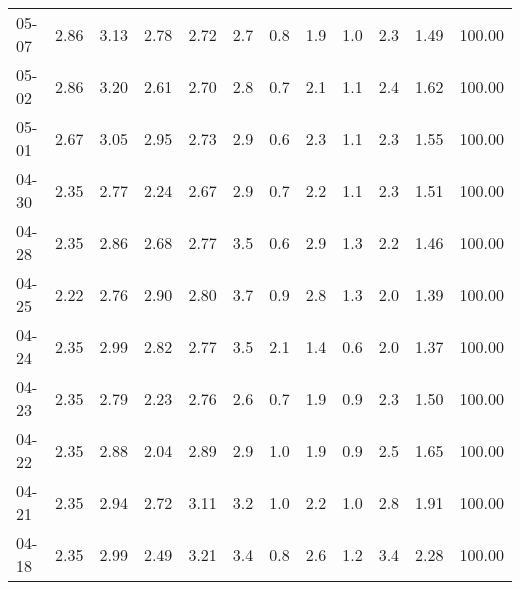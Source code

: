 \begin{threeparttable}
{\begin{tabular}{lrrrrrrrrrrr}
  05-07 &          2.86 &          3.13 &          2.78 &        2.72 &                 2.7 &                 0.8 &        1.9 &                 1.0 &              2.3 &            1.49 &                 100.00 \\
  05-02 &          2.86 &          3.20 &          2.61 &        2.70 &                 2.8 &                 0.7 &        2.1 &                 1.1 &              2.4 &            1.62 &                 100.00 \\
  05-01 &          2.67 &          3.05 &          2.95 &        2.73 &                 2.9 &                 0.6 &        2.3 &                 1.1 &              2.3 &            1.55 &                 100.00 \\
  04-30 &          2.35 &          2.77 &          2.24 &        2.67 &                 2.9 &                 0.7 &        2.2 &                 1.1 &              2.3 &            1.51 &                 100.00 \\
  04-28 &          2.35 &          2.86 &          2.68 &        2.77 &                 3.5 &                 0.6 &        2.9 &                 1.3 &              2.2 &            1.46 &                 100.00 \\
  04-25 &          2.22 &          2.76 &          2.90 &        2.80 &                 3.7 &                 0.9 &        2.8 &                 1.3 &              2.0 &            1.39 &                 100.00 \\
  04-24 &          2.35 &          2.99 &          2.82 &        2.77 &                 3.5 &                 2.1 &        1.4 &                 0.6 &              2.0 &            1.37 &                 100.00 \\
  04-23 &          2.35 &          2.79 &          2.23 &        2.76 &                 2.6 &                 0.7 &        1.9 &                 0.9 &              2.3 &            1.50 &                 100.00 \\
  04-22 &          2.35 &          2.88 &          2.04 &        2.89 &                 2.9 &                 1.0 &        1.9 &                 0.9 &              2.5 &            1.65 &                 100.00 \\
  04-21 &          2.35 &          2.94 &          2.72 &        3.11 &                 3.2 &                 1.0 &        2.2 &                 1.0 &              2.8 &            1.91 &                 100.00 \\
  04-18 &          2.35 &          2.99 &          2.49 &        3.21 &                 3.4 &                 0.8 &        2.6 &                 1.2 &              3.4 &            2.28 &                 100.00 \\

\end{tabular}}
\end{threeparttable}
